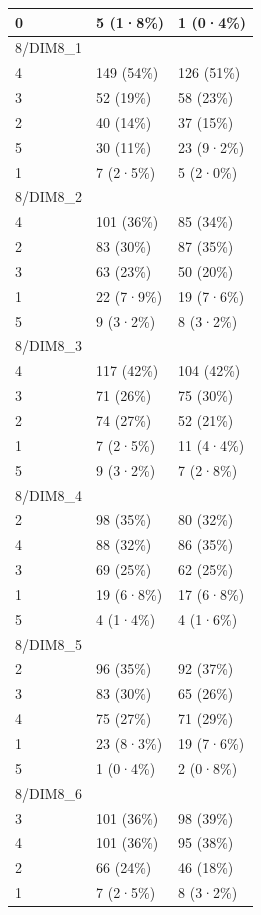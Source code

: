 \documentclass[
]{book}
\begin{document}
\begin{tabular}{l|l|l}
\hline
0 & 5 (1·8\%) & 1 (0·4\%)\\
\hline
8/DIM8\_1 &  & \\
\hline
4 & 149 (54\%) & 126 (51\%)\\
\hline
3 & 52 (19\%) & 58 (23\%)\\
\hline
2 & 40 (14\%) & 37 (15\%)\\
\hline
5 & 30 (11\%) & 23 (9·2\%)\\
\hline
1 & 7 (2·5\%) & 5 (2·0\%)\\
\hline
8/DIM8\_2 &  & \\
\hline
4 & 101 (36\%) & 85 (34\%)\\
\hline
2 & 83 (30\%) & 87 (35\%)\\
\hline
3 & 63 (23\%) & 50 (20\%)\\
\hline
1 & 22 (7·9\%) & 19 (7·6\%)\\
\hline
5 & 9 (3·2\%) & 8 (3·2\%)\\
\hline
8/DIM8\_3 &  & \\
\hline
4 & 117 (42\%) & 104 (42\%)\\
\hline
3 & 71 (26\%) & 75 (30\%)\\
\hline
2 & 74 (27\%) & 52 (21\%)\\
\hline
1 & 7 (2·5\%) & 11 (4·4\%)\\
\hline
5 & 9 (3·2\%) & 7 (2·8\%)\\
\hline
8/DIM8\_4 &  & \\
\hline
2 & 98 (35\%) & 80 (32\%)\\
\hline
4 & 88 (32\%) & 86 (35\%)\\
\hline
3 & 69 (25\%) & 62 (25\%)\\
\hline
1 & 19 (6·8\%) & 17 (6·8\%)\\
\hline
5 & 4 (1·4\%) & 4 (1·6\%)\\
\hline
8/DIM8\_5 &  & \\
\hline
2 & 96 (35\%) & 92 (37\%)\\
\hline
3 & 83 (30\%) & 65 (26\%)\\
\hline
4 & 75 (27\%) & 71 (29\%)\\
\hline
1 & 23 (8·3\%) & 19 (7·6\%)\\
\hline
5 & 1 (0·4\%) & 2 (0·8\%)\\
\hline
8/DIM8\_6 &  & \\
\hline
3 & 101 (36\%) & 98 (39\%)\\
\hline
4 & 101 (36\%) & 95 (38\%)\\
\hline
2 & 66 (24\%) & 46 (18\%)\\
\hline
1 & 7 (2·5\%) & 8 (3·2\%)\\

\end{tabular}
\end{document}
